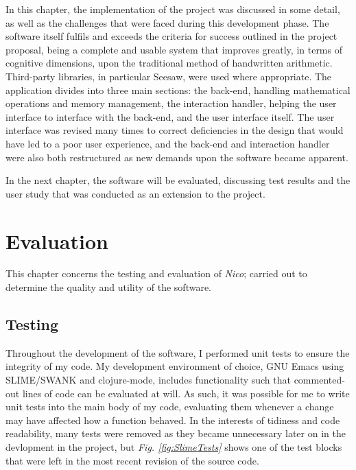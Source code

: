 \documentclass[12pt,twoside,notitlepage,xetex]{report}
\begin{document}
In this chapter, the implementation of the project was discussed in some
detail, as well as the challenges that were faced during this development
phase.  The software itself fulfils and exceeds the criteria for success
outlined in the project proposal, being a complete and usable system that
improves greatly, in terms of cognitive dimensions, upon the traditional method
of handwritten arithmetic.  Third-party libraries, in particular Seesaw, were
used where appropriate.  The application divides into three main sections: the
back-end, handling mathematical operations and memory management, the
interaction handler, helping the user interface to interface with the back-end,
and the user interface itself.  The user interface was revised many times to
correct deficiencies in the design that would have led to a poor user
experience, and the back-end and interaction handler were also both restructured
as new demands upon the software became apparent.

In the next chapter, the software will be evaluated, discussing test results
and the user study that was conducted as an extension to the project.

\cleardoublepage
\chapter{Evaluation}

This chapter concerns the testing and evaluation of \emph{Nico}; carried out to determine the quality and utility of the software.

\section{Testing}%

Throughout the development of the software, I performed unit tests to ensure
the integrity of my code.  My development environment of choice, GNU Emacs
using SLIME/SWANK and clojure-mode, includes functionality such that
commented-out lines of code can be evaluated at will.  As such, it was possible
for me to write unit tests into the main body of my code, evaluating them
whenever a change may have affected how a function behaved.  In the interests
of tidiness and code readability, many tests were removed as they became
unnecessary later on in the devlopment in the project, but \emph{Fig. \ref{fig:SlimeTests}}
shows one of the test blocks that were left in the most recent revision of the
source code.
\end{document}
